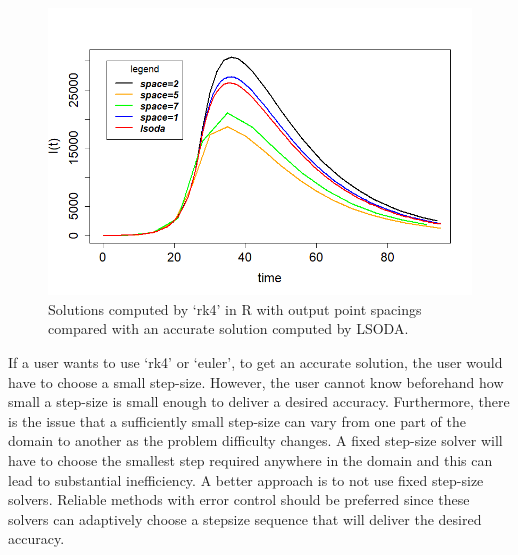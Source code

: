 \begin{figure}[H]
\centering
\includegraphics[width=0.7\linewidth]{./figures/rk4_messing_up_no_event_R}
\caption{Solutions computed by `rk4' in R with output point spacings compared with an accurate solution computed by LSODA.}
\label{fig:rk4_messing_up_no_event_R}
\end{figure}

If a user wants to use `rk4' or `euler', to get an accurate solution, the user would have to choose a small step-size. However, the user cannot know beforehand how small a step-size is small enough to deliver a desired accuracy. Furthermore, there is the issue that a sufficiently small step-size can vary from one part of the domain to another as the problem difficulty changes. A fixed step-size solver will have to choose the smallest step required anywhere in the domain and this can lead to substantial inefficiency. A better approach is to not use fixed step-size solvers. Reliable methods with error control should be preferred since these solvers can adaptively choose a stepsize sequence that will deliver the desired accuracy.

